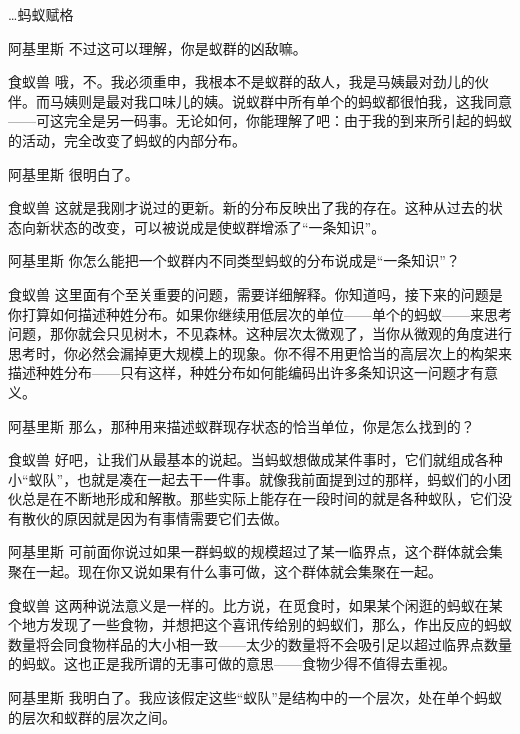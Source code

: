 \begin{dialog}{…蚂蚁赋格}
\begin{dialogue}
\item[阿基里斯]不过这可以理解，你是蚁群的凶敌嘛。

\item[食蚁兽]哦，不。我必须重申，我根本不是蚁群的敌人，我是马姨最对劲儿的伙伴。而马姨则是最对我口味儿的姨。说蚁群中所有单个的蚂蚁都很怕我，这我同意——可这完全是另一码事。无论如何，你能理解了吧：由于我的到来所引起的蚂蚁的活动，完全改变了蚂蚁的内部分布。

\item[阿基里斯]很明白了。

\item[食蚁兽]这就是我刚才说过的更新。新的分布反映出了我的存在。这种从过去的状态向新状态的改变，可以被说成是使蚁群增添了“一条知识”。

\item[阿基里斯]你怎么能把一个蚁群内不同类型蚂蚁的分布说成是“一条知识”？

\item[食蚁兽]这里面有个至关重要的问题，需要详细解释。你知道吗，接下来的问题是你打算如何描述种姓分布。如果你继续用低层次的单位——单个的蚂蚁——来思考问题，那你就会只见树木，不见森林。这种层次太微观了，当你从微观的角度进行思考时，你必然会漏掉更大规模上的现象。你不得不用更恰当的高层次上的构架来描述种姓分布——只有这样，种姓分布如何能编码出许多条知识这一问题才有意义。

\item[阿基里斯]那么，那种用来描述蚁群现存状态的恰当单位，你是怎么找到的？

\item[食蚁兽]好吧，让我们从最基本的说起。当蚂蚁想做成某件事时，它们就组成各种小“蚁队”，也就是凑在一起去干一件事。就像我前面提到过的那样，蚂蚁们的小团伙总是在不断地形成和解散。那些实际上能存在一段时间的就是各种蚁队，它们没有散伙的原因就是因为有事情需要它们去做。

\item[阿基里斯]可前面你说过如果一群蚂蚁的规模超过了某一临界点，这个群体就会集聚在一起。现在你又说如果有什么事可做，这个群体就会集聚在一起。

\item[食蚁兽]这两种说法意义是一样的。比方说，在觅食时，如果某个闲逛的蚂蚁在某个地方发现了一些食物，并想把这个喜讯传给别的蚂蚁们，那么，作出反应的蚂蚁数量将会同食物样品的大小相一致——太少的数量将不会吸引足以超过临界点数量的蚂蚁。这也正是我所谓的无事可做的意思——食物少得不值得去重视。

\item[阿基里斯]我明白了。我应该假定这些“蚁队”是结构中的一个层次，处在单个蚂蚁的层次和蚁群的层次之间。


\end{dialogue}
\end{dialog}
